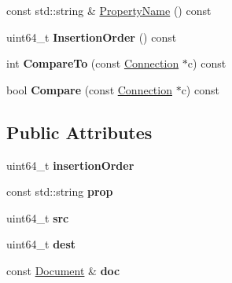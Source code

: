 \begin{DoxyCompactItemize}
\item 
const std\+::string \& \hyperlink{class_assimp_1_1_f_b_x_1_1_connection_a59b31ba44152468d177ebb091d15f192}{Property\+Name} () const 
\item 
\hypertarget{class_assimp_1_1_f_b_x_1_1_connection_ac77b87a7a322129f38f69b309fd1f3c9}{uint64\+\_\+t {\bfseries Insertion\+Order} () const }\label{class_assimp_1_1_f_b_x_1_1_connection_ac77b87a7a322129f38f69b309fd1f3c9}

\item 
\hypertarget{class_assimp_1_1_f_b_x_1_1_connection_a6379ecd25f53ea6bfec0931ce685b4b9}{int {\bfseries Compare\+To} (const \hyperlink{class_assimp_1_1_f_b_x_1_1_connection}{Connection} $\ast$c) const }\label{class_assimp_1_1_f_b_x_1_1_connection_a6379ecd25f53ea6bfec0931ce685b4b9}

\item 
\hypertarget{class_assimp_1_1_f_b_x_1_1_connection_a283fcac333a4c3098b2db1d7ac678744}{bool {\bfseries Compare} (const \hyperlink{class_assimp_1_1_f_b_x_1_1_connection}{Connection} $\ast$c) const }\label{class_assimp_1_1_f_b_x_1_1_connection_a283fcac333a4c3098b2db1d7ac678744}

\end{DoxyCompactItemize}
\subsection*{Public Attributes}
\begin{DoxyCompactItemize}
\item 
\hypertarget{class_assimp_1_1_f_b_x_1_1_connection_a98082b6a226f6a2c970e8cdce03f8b24}{uint64\+\_\+t {\bfseries insertion\+Order}}\label{class_assimp_1_1_f_b_x_1_1_connection_a98082b6a226f6a2c970e8cdce03f8b24}

\item 
\hypertarget{class_assimp_1_1_f_b_x_1_1_connection_ab79d348f73da7dc480699c882f94e998}{const std\+::string {\bfseries prop}}\label{class_assimp_1_1_f_b_x_1_1_connection_ab79d348f73da7dc480699c882f94e998}

\item 
\hypertarget{class_assimp_1_1_f_b_x_1_1_connection_aeea0bfe0938cdcf704ea6b620528cce3}{uint64\+\_\+t {\bfseries src}}\label{class_assimp_1_1_f_b_x_1_1_connection_aeea0bfe0938cdcf704ea6b620528cce3}

\item 
\hypertarget{class_assimp_1_1_f_b_x_1_1_connection_a61ac78347b4d7708c3719334c073d3d8}{uint64\+\_\+t {\bfseries dest}}\label{class_assimp_1_1_f_b_x_1_1_connection_a61ac78347b4d7708c3719334c073d3d8}

\item 
\hypertarget{class_assimp_1_1_f_b_x_1_1_connection_a785f3925ce72112cc16b692e52b6b7e6}{const \hyperlink{class_assimp_1_1_f_b_x_1_1_document}{Document} \& {\bfseries doc}}\label{class_assimp_1_1_f_b_x_1_1_connection_a785f3925ce72112cc16b692e52b6b7e6}

\end{DoxyCompactItemize}


